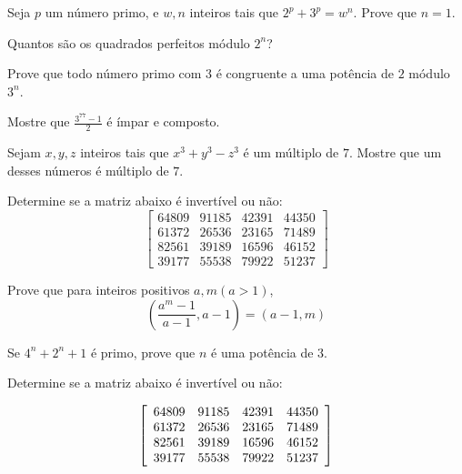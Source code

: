 \begin{questao}
  Seja $p$ um número primo, e $w,n$ inteiros tais que
  $2^p+3^p=w^n$. Prove que $n=1$.
\end{questao}

\begin{questao}
  Quantos são os quadrados perfeitos módulo $2^n$?
\end{questao}

\begin{questao}
  Prove que todo número primo com $3$ é congruente a uma potência de
  $2$ módulo $3^n$.
\end{questao}

\begin{questao}
  Mostre que $ \frac{3^{77}-1}{2} $ é ímpar e composto.
\end{questao}

\begin{questao}
  Sejam $x,y,z$ inteiros tais que $x^3+y^3-z^3$ é um múltiplo de
  $7$. Mostre que um desses números é múltiplo de $7$.
\end{questao}

\begin{questao}
  Determine se a matriz abaixo é invertível ou não:
  $$ \left[
    \begin{array}{cccc}
      64809 & 91185 & 42391 & 44350 \\
      61372 & 26536 & 23165 & 71489 \\
      82561 & 39189 & 16596 & 46152 \\
      39177 & 55538 & 79922 & 51237
    \end{array}
  \right] $$

\end{questao}

\begin{questao}
  Prove que para inteiros positivos $a,m (a>1)$,
  $$\left(\frac{a^m-1}{a-1},a-1 \right) = (a-1,m)$$
\end{questao}

\begin{questao}
  Se $4^n+2^n+1$ é primo, prove que $n$ é uma potência de
  $3$.

\end{questao}

\begin{questao}
  Determine se a matriz abaixo é invertível ou não:

  $$ \left[ 
    \begin{array}[center]{cccc}
      64809 & 91185 & 42391 & 44350 \\
      61372 & 26536 & 23165 & 71489 \\
      82561 & 39189 & 16596 & 46152 \\
      39177 & 55538 & 79922 & 51237
    \end{array}
  \right] $$
\end{questao}

